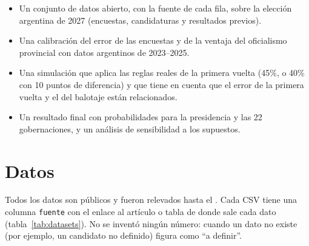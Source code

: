 \documentclass{article}
\begin{document}
\begin{itemize}
  \item Un conjunto de datos abierto, con la fuente de cada fila, sobre la
        elección argentina de 2027 (encuestas, candidaturas y resultados previos).
  \item Una calibración del error de las encuestas y de la ventaja del
        oficialismo provincial con datos argentinos de 2023--2025.
  \item Una simulación que aplica las reglas reales de la primera vuelta
        (45\%, o 40\% con 10 puntos de diferencia) y que tiene en cuenta que el
        error de la primera vuelta y el del balotaje están relacionados.
  \item Un resultado final con probabilidades para la presidencia y las 22
        gobernaciones, y un análisis de sensibilidad a los supuestos.
\end{itemize}

\section{Datos}
\label{sec:datos}

Todos los datos son públicos y fueron relevados hasta el \fechaCorte. Cada CSV
tiene una columna \texttt{fuente} con el enlace al artículo o tabla de donde sale
cada dato (tabla~\ref{tab:datasets}). No se inventó ningún número: cuando un dato
no existe (por ejemplo, un candidato no definido) figura como ``a definir''.
\end{document}

